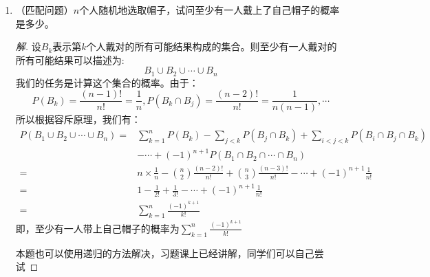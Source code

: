 \documentclass[12pt]{article}
\newcommand{\hei}{\CJKfamily{hei}}                          %
\begin{document}
\begin{enumerate}
\item {\hei （匹配问题）$n$个人随机地选取帽子，试问至少有一人戴上了自己帽子的概率是多少。}
\begin{proof}[解]
	设$B_k$表示第$k$个人戴对的所有可能结果构成的集合。则至少有一人戴对的所有可能结果可以描述为:
	\begin{equation}
	B_1\cup B_2\cup\cdots\cup B_n
	\end{equation}
	我们的任务是计算这个集合的概率。由于：
	\begin{equation}
	P(B_k)=\frac{(n-1)!}{n!}=\frac{1}{n},P(B_k\cap B_j)=\frac{(n-2)!}{n!}=\frac{1}{n(n-1)},\cdots
	\end{equation}
	所以根据容斥原理，我们有：
	\begin{equation}
	\begin{aligned}
	P(B_1\cup B_2\cup\cdots\cup B_n)=&\sum_{k=1}^{n}P(B_k)-\sum_{j<k}P(B_j\cap B_k)+\sum_{i<j<k}P(B_i\cap B_j\cap B_k) \\
	&-\cdots+(-1)^{n+1}P(B_1\cap B_2\cap \cdots \cap B_n) \\
	=&n\times\frac{1}{n}-\binom{n}{2}\frac{(n-2)!}{n!}+\binom{n}{3}\frac{(n-3)!}{n!}-\cdots+(-1)^{n+1}\frac{1}{n!} \\
	=&1-\frac{1}{2!}+\frac{1}{3!}-\cdots+(-1)^{n+1}\frac{1}{n!} \\
	=&\sum_{k=1}^{n}\frac{(-1)^{k+1}}{k!}
	\end{aligned}
	\end{equation}
	即，至少有一人带上自己帽子的概率为$\sum_{k=1}^{n}\frac{(-1)^{k+1}}{k!}$
	
	{\hei 本题也可以使用递归的方法解决，习题课上已经讲解，同学们可以自己尝试}
\end{proof}


\end{enumerate}
\end{document}

